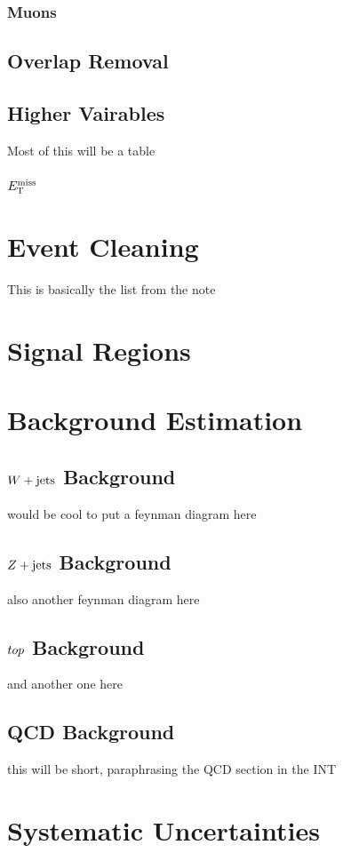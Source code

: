 \subsubsection{Muons}
\subsection{Overlap Removal}
\subsection{Higher Vairables}
Most of this will be a table
\subsubsection{$E_{\rm T}^{\rm miss}$}

\section{Event Cleaning}
This is basically the list from the note

\section{Signal Regions}

\section{Background Estimation}
\label{sec:backgrounds}
\subsection{$W + \text{jets}$ Background}
would be cool to put a feynman diagram here
\subsection{$Z + \text{jets}$ Background}
also another feynman diagram here
\subsection{$top$ Background}
and another one here
\subsection{QCD Background}
this will be short, paraphrasing the QCD section in the INT

\section{Systematic Uncertainties}
\label{sec:systematics}
